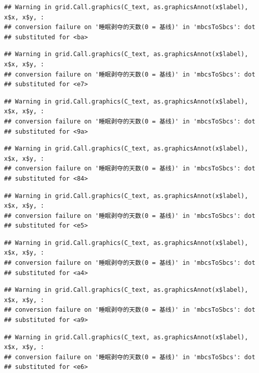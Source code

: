 \documentclass[
]{book}
\begin{document}
\begin{verbatim}
## Warning in grid.Call.graphics(C_text, as.graphicsAnnot(x$label), x$x, x$y, :
## conversion failure on '睡眠剥夺的天数(0 = 基线)' in 'mbcsToSbcs': dot
## substituted for <ba>
\end{verbatim}

\begin{verbatim}
## Warning in grid.Call.graphics(C_text, as.graphicsAnnot(x$label), x$x, x$y, :
## conversion failure on '睡眠剥夺的天数(0 = 基线)' in 'mbcsToSbcs': dot
## substituted for <e7>
\end{verbatim}

\begin{verbatim}
## Warning in grid.Call.graphics(C_text, as.graphicsAnnot(x$label), x$x, x$y, :
## conversion failure on '睡眠剥夺的天数(0 = 基线)' in 'mbcsToSbcs': dot
## substituted for <9a>
\end{verbatim}

\begin{verbatim}
## Warning in grid.Call.graphics(C_text, as.graphicsAnnot(x$label), x$x, x$y, :
## conversion failure on '睡眠剥夺的天数(0 = 基线)' in 'mbcsToSbcs': dot
## substituted for <84>
\end{verbatim}

\begin{verbatim}
## Warning in grid.Call.graphics(C_text, as.graphicsAnnot(x$label), x$x, x$y, :
## conversion failure on '睡眠剥夺的天数(0 = 基线)' in 'mbcsToSbcs': dot
## substituted for <e5>
\end{verbatim}

\begin{verbatim}
## Warning in grid.Call.graphics(C_text, as.graphicsAnnot(x$label), x$x, x$y, :
## conversion failure on '睡眠剥夺的天数(0 = 基线)' in 'mbcsToSbcs': dot
## substituted for <a4>
\end{verbatim}

\begin{verbatim}
## Warning in grid.Call.graphics(C_text, as.graphicsAnnot(x$label), x$x, x$y, :
## conversion failure on '睡眠剥夺的天数(0 = 基线)' in 'mbcsToSbcs': dot
## substituted for <a9>
\end{verbatim}

\begin{verbatim}
## Warning in grid.Call.graphics(C_text, as.graphicsAnnot(x$label), x$x, x$y, :
## conversion failure on '睡眠剥夺的天数(0 = 基线)' in 'mbcsToSbcs': dot
## substituted for <e6>
\end{verbatim}
\end{document}
